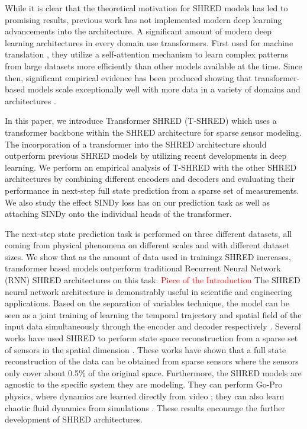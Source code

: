 \documentclass[11pt, a4paper]{article}
\begin{document}
While it is clear that the theoretical motivation for SHRED models has led to promising results, previous work has not implemented modern deep learning advancements into the architecture. A significant amount of modern deep learning architectures in every domain use transformers. First used for machine translation \cite{vaswani2017attention}, they utilize a self-attention mechanism to learn complex patterns from large datasets more efficiently than other models available at the time. Since then, significant empirical evidence has been produced showing that transformer-based models scale exceptionally well with more data in a variety of domains and architectures \cite{Zhai_2022_CVPR, kaplan2020scaling, liang2024scaling}. 

In this paper, we introduce Transformer SHRED (T-SHRED) which uses a transformer backbone within the SHRED architecture for sparse sensor modeling. The incorporation of a transformer into the SHRED architecture should outperform previous SHRED models by utilizing recent developments in deep learning. We perform an empirical analysis of T-SHRED with the other SHRED architectures by combining different encoders and decoders and evaluating their performance in next-step full state prediction from a sparse set of measurements. We also study the effect SINDy loss \cite{gao2025sparseidentificationnonlineardynamics} has on our prediction task as well as attaching SINDy onto the individual heads of the transformer.

The next-step state prediction task is performed on three different datasets, all coming from physical phenomena on different scales and with different dataset sizes. We show that as the amount of data used in trainingz SHRED increases, transformer based models outperform traditional Recurrent Neural Network (RNN) SHRED architectures on this task.
\noindent 
\textcolor{red}{Piece of the Introduction}
The SHRED neural network architecture is demonstrably useful in scientific and engineering applications. Based on the separation of variables technique, the model can be seen as a joint training of learning the temporal trajectory and spatial field of the input data simultaneously through the encoder and decoder respectively \cite{williams2024sensing}. Several works have used SHRED to perform state space reconstruction from a sparse set of sensors in the spatial dimension \cite{williams2024sensing, tomasetto2025reducedordermodelingshallow, gao2025sparseidentificationnonlineardynamics}. These works have shown that a full state reconstruction of the data can be obtained from sparse sensors where the sensors only cover about 0.5\% of the original space. Furthermore, the SHRED models are agnostic to the specific system they are modeling. They can perform Go-Pro physics, where dynamics are learned directly from video \cite{gao2025sparseidentificationnonlineardynamics, tomasetto2025reducedordermodelingshallow}; they can also learn chaotic fluid dynamics from simulations \cite{tomasetto2025reducedordermodelingshallow, gao2025sparseidentificationnonlineardynamics}. These results encourage the further development of SHRED architectures.
\end{document}
